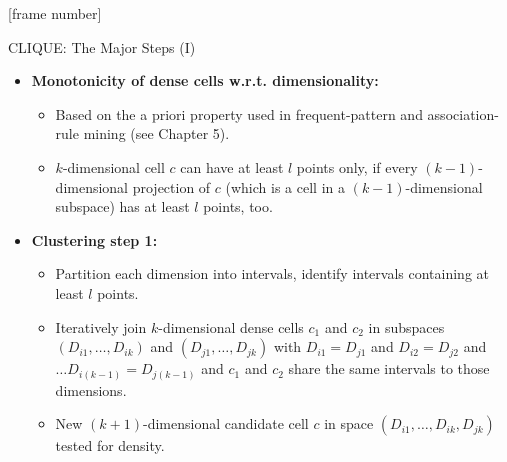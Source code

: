 \documentclass[aspectratio=169,t,xcolor=dvipsnames]{beamer}
\begin{document}
  {
    [frame number]
    \begin{frame}{CLIQUE: The Major Steps (I)}
      \begin{itemize}
        \item \textbf{Monotonicity of dense cells w.r.t. dimensionality:}
        \begin{itemize}
          \item Based on the a priori property used in frequent-pattern and association-rule mining (see Chapter 5).
          \item $k$-dimensional cell $c$ can have at least $l$ points only, if every $(k-1)$-dimensional projection of $c$ (which is a cell in a $(k-1)$-dimensional subspace) has at least $l$ points, too.
        \end{itemize}
        \item \textbf{Clustering step 1:}
        \begin{itemize}
          \item Partition each dimension into intervals, identify intervals containing at least $l$ points.
          \item Iteratively join $k$-dimensional dense cells $c_1$ and $c_2$ in subspaces $(D_{i1}, \ldots, D_{ik})$ and $(D_{j1}, \ldots, D_{jk})$ with $D_{i1} = D_{j1}$ and $D_{i2} = D_{j2}$ and $\ldots D_{i(k-1)} = D_{j(k-1)}$ and $c_1$ and $c_2$ share the same intervals to those dimensions.
          \item New $(k+1)$-dimensional candidate cell $c$ in space $(D_{i1}, \ldots, D_{ik}, D_{jk})$ tested for density.
        \end{itemize}
      \end{itemize}
    \end{frame}
  }
\end{document}
